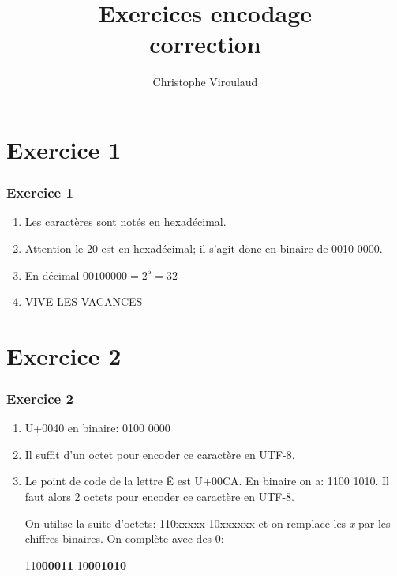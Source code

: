 \documentclass[svgnames,11pt]{beamer}
\author[]{Christophe Viroulaud}
\title{Exercices encodage\\correction}
\date{\framebox{\textbf{DonRep 15}}}
\institute{Première - NSI}
\begin{document}
\begin{frame}
    \titlepage
\end{frame}
\section{Exercice 1}
\begin{frame}
    \frametitle{Exercice 1}

    \begin{enumerate}
        \item Les caractères sont notés en hexadécimal.
        \item Attention le 20 est en hexadécimal; il s'agit donc en binaire de 0010 0000.
        \item En décimal $00100000 = 2^5 = 32$
        \item VIVE LES VACANCES
    \end{enumerate}

\end{frame}
\section{Exercice 2}
\begin{frame}
    \frametitle{Exercice 2}

    \begin{enumerate}
        \item U+0040 en binaire: 0100 0000
        \item Il suffit d'un octet pour encoder ce caractère en UTF-8.
        \item Le point de code de la lettre Ê est U+00CA. En binaire on a: 1100 1010. Il faut alors 2 octets pour encoder ce caractère en UTF-8.

              On utilise la suite d'octets: 110xxxxx 10xxxxxx et on remplace les \emph{x} par les chiffres binaires. On complète avec des 0:
              \begin{center}
                  110\textbf{00011} 10\textbf{001010}

              \end{center}
    \end{enumerate}

\end{frame}
\end{document}
